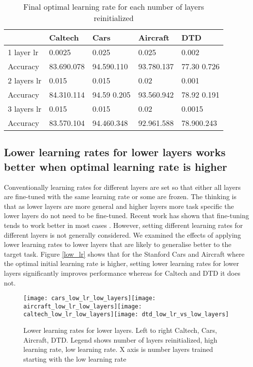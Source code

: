 \documentclass[]{article}
\begin{document}
\begin{table}[th]

\caption{Final optimal learning rate for each number of layers reinitialized}
\label{final layers vs lr}
\centering
\begin{tabular}{p{2cm}p{2.3cm}p{2.3cm}p{2.3cm}p{2.3cm}}
\hline 
 & Caltech & Cars & Aircraft & DTD\tabularnewline
\hline 
1 layer lr & 0.0025 & 0.025 & 0.025 & 0.002\tabularnewline
Accuracy & 83.690.078 & 94.590.110 & 93.780.137 & 77.30 0.726\tabularnewline
2 layers lr & 0.015 & 0.015  & 0.02 & 0.001\tabularnewline
Accuracy & 84.310.114 & 94.59 0.205 & 93.560.942 & 78.92 0.191\tabularnewline
3 layers lr & 0.015 & 0.015  & 0.02 & 0.0015 \tabularnewline
Accuracy & 83.570.104 & 94.460.348 & 92.961.588 & 78.900.243\tabularnewline
\hline 
\end{tabular}
\end{table}


\subsection{Lower learning rates for lower layers works better when optimal learning
rate is higher}

Conventionally learning rates for different layers are set so that either
all layers are fine-tuned with the same learning rate or some are
frozen. The thinking is that as lower layers are more general and
higher layers more task specific \cite{yosinski2014transferable}
the lower layers do not need to be fine-tuned. Recent work has shown
that fine-tuning tends to work better in most cases \cite{plested2019analysis}.
However, setting different learning rates for different layers is not
generally considered. We examined the effects of applying lower learning
rates to lower layers that are likely to generalise better to the
target task. Figure \ref{low_lr} shows that for the Stanford Cars and
Aircraft where the optimal initial learning rate is higher, setting
lower learning rates for lower layers significantly improves performance
whereas for Caltech and DTD it does not. 

\begin{figure}[th]

\begin{centering}
\par\end{centering}
\begin{centering}
\texttt{[image: cars\_low\_lr\_low\_layers]}\texttt{[image: aircraft\_low\_lr\_low\_layers]}\texttt{[image: caltech\_low\_lr\_low\_layers]}\texttt{[image: dtd\_low\_lr\_vs\_low\_layers]}
\caption{Lower learning rates for lower layers. Left to right Caltech, Cars, Aircraft, DTD. Legend shows number of layers reinitialized, high learning rate, low learning rate. X axis is number layers trained starting with the low learning rate}
\par\end{centering}
\end{figure}
\end{document}
